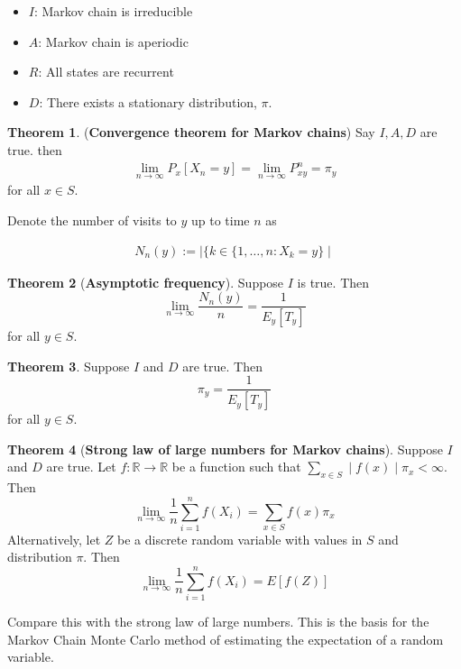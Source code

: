 \documentclass[12pt]{article}
\theoremstyle{definition}
\newtheorem{theorem}{Theorem}[section]
\begin{document}
\begin{itemize}
  \item $I$: Markov chain is irreducible
  \item $A$: Markov chain is aperiodic
  \item $R$: All states are recurrent
  \item $D$: There exists a stationary distribution, $\pi$.
\end{itemize}

\begin{theorem}(\textbf{Convergence theorem for Markov chains})
  Say $I, A, D$ are true. then
  \begin{align*}
    \lim_{n \rightarrow \infty} P_x[X_n = y] = \lim_{n \rightarrow \infty} P_{xy}^n = \pi_y
  \end{align*}
  for all $x \in S$.
\end{theorem}

Denote the number of visits to $y$ up to time $n$ as

\begin{align*}
  N_n(y) := \mid \{k \in \{1, \dots, n : X_k = y\} \mid
\end{align*}


\begin{theorem}[\textbf{Asymptotic frequency}]
  Suppose $I$ is true. Then
  $$
  \lim_{n \rightarrow \infty} \frac{N_n(y)}{n} = \frac{1}{E_y[T_y]}
  $$
  for all $y \in S$.
\end{theorem}

\begin{theorem}
  Suppose $I$ and $D$ are true. Then
  $$
\pi_y = \frac{1}{E_y[T_y]}
  $$
  for all $y \in S$.
\end{theorem}

\begin{theorem}[\textbf{Strong law of large numbers for Markov chains}]
  Suppose $I$ and $D$ are true. Let $f: \mathbb{R} \rightarrow \mathbb{R}$ be a function such that $\sum_{x \in S} \mid f(x) \mid \pi_x < \infty$. Then
$$
\lim_{n \rightarrow \infty} \frac{1}{n}\sum_{i=1}^n f(X_i)
 = \sum_{x \in S} f(x)\pi_x
$$
Alternatively, let $Z$ be a discrete random variable with values in $S$ and distribution $\pi$. Then
$$
\lim_{n \rightarrow \infty} \frac{1}{n} \sum_{i =1}^n f(X_i) = E[f(Z)]
$$
\end{theorem}

Compare this with the strong law of large numbers. This is the basis for the Markov Chain Monte Carlo method of estimating the expectation of a random variable.
\end{document}
